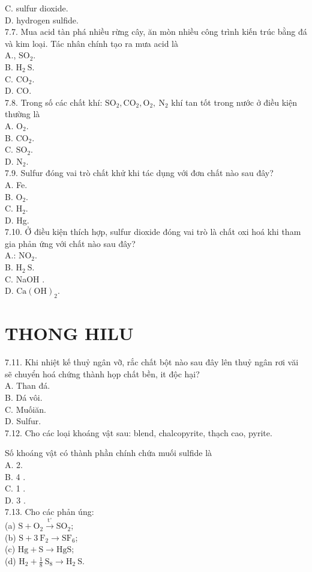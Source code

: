 \documentclass[10pt]{article}
\begin{document}
C. sulfur dioxide.\\
D. hydrogen sulfide.\\
7.7. Mua acid tàn phá nhiều rừng cây, ăn mòn nhiều công trình kiến trúc bằng đá và kim loại. Tác nhân chính tạo ra mưa acid là\\
A., $\mathrm{SO}_{2}$.\\
B. $\mathrm{H}_{2} \mathrm{~S}$.\\
C. $\mathrm{CO}_{2}$.\\
D. CO.\\
7.8. Trong số các chất khí: $\mathrm{SO}_{2}, \mathrm{CO}_{2}, \mathrm{O}_{2}, \mathrm{~N}_{2}$ khí tan tốt trong nước ở điều kiện thường là\\
A. $\mathrm{O}_{2}$.\\
B. $\mathrm{CO}_{2}$.\\
C. $\mathrm{SO}_{2}$.\\
D. $\mathrm{N}_{2}$.\\
7.9. Sulfur đóng vai trò chất khử khi tác dụng với đơn chất nào sau đây?\\
A. Fe.\\
B. $\mathrm{O}_{2}$.\\
C. $\mathrm{H}_{2}$.\\
D. Hg.\\
7.10. Ở điều kiện thích hợp, sulfur dioxide đóng vai trò là chất oxi hoá khi tham gia phản ứng với chất nào sau đây?\\
A.: $\mathrm{NO}_{2}$.\\
B. $\mathrm{H}_{2} \mathrm{~S}$.\\
C. NaOH .\\
D. $\mathrm{Ca}(\mathrm{OH})_{2}$.

\section*{THONG HILU}
7.11. Khi nhiệt kế thuỷ ngân vỡ, rắc chất bột nào sau đây lên thuỷ ngân rơi văi sẽ chuyển hoá chứng thành họp chất bền, it độc hại?\\
A. Than đá.\\
B. Dá vôi.\\
C. Muốiăn.\\
D. Sulfur.\\
7.12. Cho các loại khoáng vật sau: blend, chalcopyrite, thạch cao, pyrite.

Số khoáng vật có thành phần chính chứa muối sulfide là\\
A. 2.\\
B. 4 .\\
C. 1 .\\
D. 3 .\\
7.13. Cho các phản úng:\\
(a) $\mathrm{S}+\mathrm{O}_{2} \xrightarrow{\mathrm{t}^{\circ}} \mathrm{SO}_{2}$;\\
(b) $\mathrm{S}+3 \mathrm{~F}_{2} \longrightarrow \mathrm{SF}_{6}$;\\
(c) $\mathrm{Hg}+\mathrm{S} \longrightarrow \mathrm{HgS}$;\\
(d) $\mathrm{H}_{2}+\frac{1}{8} \mathrm{~S}_{8} \longrightarrow \mathrm{H}_{2} \mathrm{~S}$.
\end{document}

